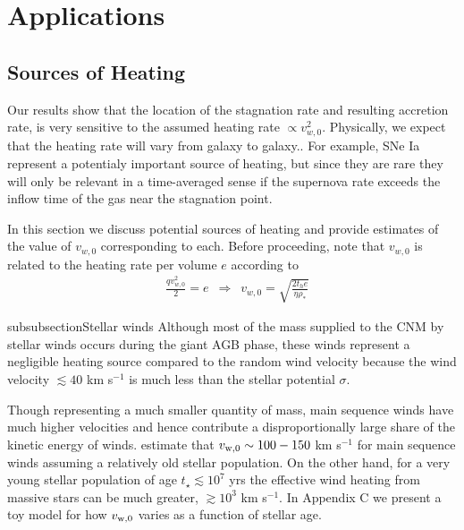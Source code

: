 \documentclass[usenatbib,fleqn]{mn2e}
\newcommand{\rhostar}{\rho_*}
\newcommand{\vwO}{v_{w,0}}
\begin{document}
\section{Applications}
\label{sec:applications}
\subsection{Sources of Heating}
\label{sec:heating}

Our results show that the location of the stagnation rate and
resulting accretion rate, is very sensitive to the assumed heating
rate $\propto v_{w,0}^{2}$.  Physically, we expect that the heating
rate will vary from galaxy to galaxy.. For example, SNe Ia represent a
potentialy important source of heating, but since they are rare they
will only be relevant in a time-averaged sense if the supernova rate
exceeds the inflow time of the gas near the stagnation point.

In this section we discuss potential sources of heating and provide estimates of the value of $\vwO$ corresponding to each.  Before proceeding, note that $\vwO$ is related to the heating rate per volume $e$ according to 
\begin{align}
  &\frac{q \vwO^2}{2}=e \,\,\,\Rightarrow\,\,\,\vwO = \sqrt{\frac{2 t_h e}{\eta \rhostar}}
  \label{eq:vw_eff}
\end{align}

subsubsection{Stellar winds} Although most of the mass supplied to the CNM by stellar winds occurs during the giant AGB phase, these winds represent a negligible heating source compared to the random wind velocity because the wind velocity $\lesssim 40$ km s$^{-1}$ is much less than the stellar potential $\sigma$.  

Though representing a much smaller quantity of mass, main sequence winds have much higher velocities and hence contribute a disproportionally large share of the kinetic energy of winds.  \citep{NaimanSoares-Furtado+:2013a} estimate that $v_{\rm w,0} \sim 100-150$ km s$^{-1}$ for main sequence winds assuming a relatively old stellar population.  On the other hand, for a very young stellar population of age $t_{\star} \lesssim 10^{7}$ yrs the effective wind heating from massive stars can be much greater, $\gtrsim 10^{3}$ km s$^{-1}$.  In Appendix C we present a toy model for how $v_{\rm w,0}$ varies as a function of stellar age.
\end{document}
